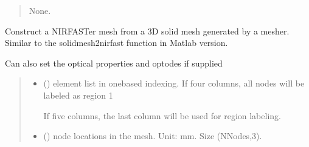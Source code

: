 \documentclass[letterpaper,10pt,english]{sphinxmanual}
\begin{document}
\begin{fulllineitems}
\begin{fulllineitems}
\begin{quote}
\begin{description}
\begin{itemize}
\end{itemize}

\sphinxAtStartPar
None.

\end{description}\end{quote}

\end{fulllineitems}


\begin{fulllineitems}
\label{\detokenize{_autosummary/nirfasterff.base.fluor_mesh.fluormesh:nirfasterff.base.fluor_mesh.fluormesh.from_solid}}
\pysigstartsignatures
\pysiglinewithargsret
{}
{\sphinxparamcomma {}\sphinxparamcomma {}\sphinxparamcomma {}\sphinxparamcomma {}\sphinxparamcomma {}}
{}
\pysigstopsignatures
\sphinxAtStartPar
Construct a NIRFASTer mesh from a 3D solid mesh generated by a mesher. Similar to the solidmesh2nirfast function in Matlab version.

\sphinxAtStartPar
Can also set the optical properties and optodes if supplied
\begin{quote}\begin{description}
\begin{itemize}
\item {} 
\sphinxAtStartPar
{} () \textendash{} 
\sphinxAtStartPar
element list in one\sphinxhyphen{}based indexing. If four columns, all nodes will be labeled as region 1

\sphinxAtStartPar
If five columns, the last column will be used for region labeling.


\item {} 
\sphinxAtStartPar
{} () \textendash{} node locations in the mesh. Unit: mm. Size (NNodes,3).


\end{itemize}
\end{description}
\end{quote}
\end{fulllineitems}
\end{fulllineitems}
\end{document}
